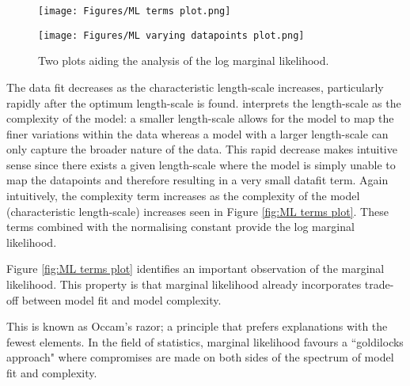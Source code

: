 \documentclass[12pt,a4paper]{article}
\begin{document}
\begin{figure}[h]
    \centering

    \begin{minipage}{0.45\textwidth}
        \centering
        \texttt{[image: Figures/ML terms plot.png]} %
        \label{fig:ML terms plot}
    \end{minipage} 
    \begin{minipage}{0.45\textwidth}
        \centering
        \texttt{[image: Figures/ML varying datapoints plot.png]} %
        \label{fig:ML varying datapoints plot}
    \end{minipage}
    \caption{Two plots aiding the analysis of the log marginal likelihood.}
    \label{fig:logml analysis plots}
\end{figure}

The data fit decreases as the characteristic length-scale increases, particularly rapidly after the optimum length-scale is found. \citet{williams2006gaussian} interprets the length-scale as the complexity of the model: a smaller length-scale allows for the model to map the finer variations within the data whereas a model with a larger length-scale can only capture the broader nature of the data. This rapid decrease makes intuitive sense since there exists a given length-scale where the model is simply unable to map the datapoints and therefore resulting in a very small datafit term. Again intuitively, the complexity term increases as the complexity of the model (characteristic length-scale) increases seen in Figure \ref{fig:ML terms plot}. These terms combined with the normalising constant
provide the log marginal likelihood.

Figure \ref{fig:ML terms plot} identifies an important observation of the marginal likelihood. This property is that marginal likelihood already incorporates trade-off between model fit and model complexity. 

This is known as Occam's razor; a principle that prefers explanations with the fewest elements. In the field of statistics, marginal likelihood favours a ``goldilocks approach" where compromises are made on both sides of the spectrum of model fit and complexity.
\end{document}
